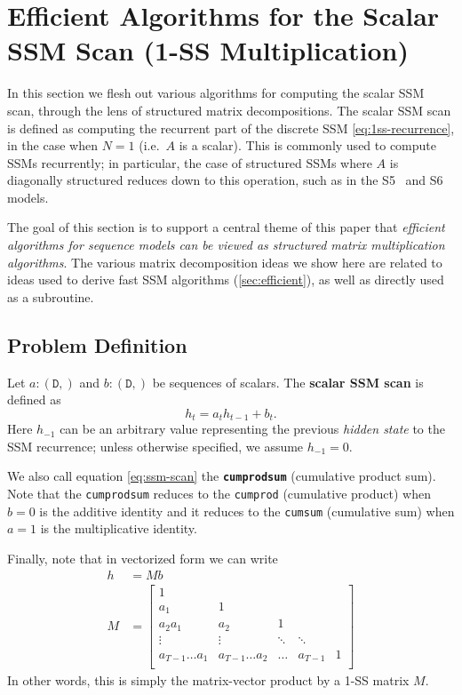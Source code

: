 \section{Efficient Algorithms for the Scalar SSM Scan (1-SS Multiplication)}
\label{sec:scan}

In this section we flesh out various algorithms for computing the scalar SSM scan, through the lens of structured matrix decompositions.
The scalar SSM scan is defined as computing the recurrent part of the discrete SSM \eqref{eq:1ss-recurrence},
in the case when $N=1$ (i.e.\ $A$ is a scalar).
This is commonly used to compute SSMs recurrently;
in particular, the case of structured SSMs where $A$ is diagonally structured reduces down to this operation,
such as in the S5~\citep{smith2023s5} and S6~\citep{gu2023mamba} models.

The goal of this section is to support a central theme of this paper that \emph{efficient algorithms for sequence models can be viewed as structured matrix multiplication algorithms}.
The various matrix decomposition ideas we show here are related to ideas used to derive fast SSM algorithms (\cref{sec:efficient}),
as well as directly used as a subroutine.


\subsection{Problem Definition}
Let $a : \mathtt{(D,)}$ and $b : \mathtt{(D,)}$ be sequences of scalars.
The \textbf{scalar SSM scan} is defined as
\begin{equation}%
  \label{eq:ssm-scan}
  h_t = a_t h_{t-1} + b_t
  .
\end{equation}
Here $h_{-1}$ can be an arbitrary value representing the previous \emph{hidden state} to the SSM recurrence;
unless otherwise specified, we assume $h_{-1} = 0$.

We also call equation \eqref{eq:ssm-scan} the \textbf{\texttt{cumprodsum}} (cumulative product sum).
Note that the \texttt{cumprodsum} reduces to the \texttt{cumprod} (cumulative product) when $b = 0$ is the additive identity and it reduces to the \texttt{cumsum} (cumulative sum) when $a=1$ is the multiplicative identity.

Finally, note that in vectorized form we can write
\begin{align*}%
  h &= M b \\
  M &=
  \begin{bmatrix}
    1 & \\
    a_1 & 1 & \\
    a_2a_1 & a_2 & 1 \\
    \vdots & \vdots & \ddots & \ddots \\
    a_{T-1}\dots a_1 & a_{T-1}\dots a_2 & \dots & a_{T-1} & 1 \\
  \end{bmatrix}
\end{align*}
In other words, this is simply the matrix-vector product by a 1-SS matrix $M$.

